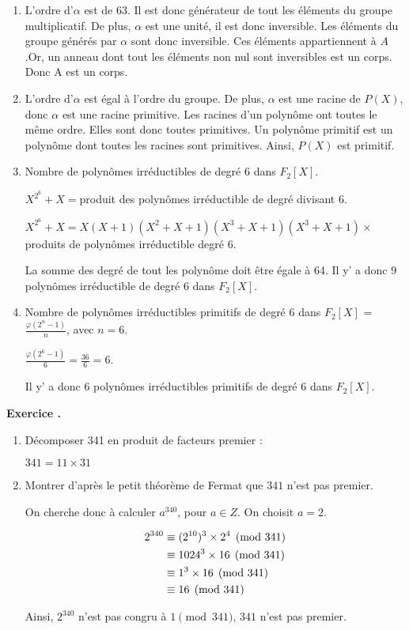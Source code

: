 \documentclass[a4paper,10pt]{article}
\newcounter{exercice}
\newcommand{\exercice}{%
		\refstepcounter{exercice}%
		\bigskip
		\bigskip
		\noindent\textbf{Exercice \theexercice.}~%
	}
\begin{document}
\begin{enumerate}
	\item
	L'ordre d'$\alpha$ est de 63. Il est donc générateur de tout les éléments du groupe multiplicatif. De plus, $\alpha$ est une unité, il est donc inversible. Les éléments du groupe générés par $\alpha$ sont donc inversible. Ces éléments appartiennent à $A$.Or, un anneau dont tout les éléments non nul sont inversibles est un corps. Donc A est un corps.
	\item
	L'ordre d'$\alpha$ est égal à l'ordre du groupe. De plus, $\alpha$ est une racine de $P(X)$, donc $\alpha$ est une racine primitive. Les racines d'un polynôme ont toutes le même ordre. Elles sont donc toutes primitives. Un polynôme primitif est un polynôme dont toutes les racines sont primitives. Ainsi, $P(X)$ est primitif.
	\item
Nombre de polynômes irréductibles de degré 6 dans $F_2[X]$.

$X^{2^6}+X=$produit des polynômes irréductible de degré divisant 6.

$X^{2^6}+X=X(X+1)(X^2+X+1)(X^3+X+1)(X^3+X+1)\times $produits de polynômes irréductible degré 6.

La somme des degré de tout les polynôme doit être égale à 64. Il y' a donc 9 polynômes irréductible de degré 6 dans $F_2[X]$.
	\item
Nombre de polynômes irréductibles primitifs de degré 6 dans $F_2[X]$ = $\frac{\varphi(2^n-1)}{n}$, avec $n=6$.


 $\frac{\varphi(2^6-1)}{6}=\frac{36}{6}=6$.
 
 Il y' a donc 6 polynômes irréductibles primitifs de degré 6 dans $F_2[X]$.

	\end{enumerate}	
	\exercice
	\begin{enumerate}
	\item
	Décomposer 341 en produit de facteurs premier :
	
	$341=11 \times 31$
	\item
	Montrer d'après le petit théorème de Fermat que $341$ n'est pas  premier.
	
	On cherche donc à calculer $a^{340}$, pour $a \in Z$.	
	On choisit $a=2$.
	
	\begin{align}
		2^{340} &\equiv (2^{10})^3 \times 2^4 \pmod{341}\notag \\
			  &\equiv 1024^3 \times 16 \pmod{341}\notag \\
			  &\equiv 1^3 \times 16 \pmod{341}\notag \\
			  &\equiv 16 \pmod{341}\notag
	\end{align}
	
	Ainsi, $2^{340}$ n'est pas congru à $1 \pmod{341}$, $341$ n'est pas premier.
	\end{enumerate}
		
	 
\end{document}

